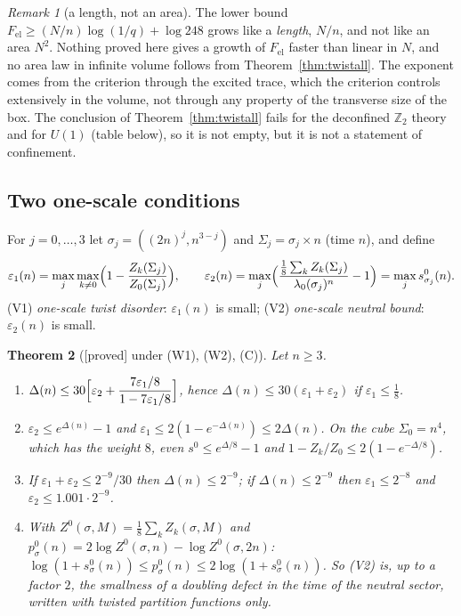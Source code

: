 \documentclass[11pt,a4paper]{article}
\theoremstyle{plain}
\newtheorem{theorem}{Theorem}[section]
\theoremstyle{definition}
\theoremstyle{remark}
\newtheorem{remark}[theorem]{Remark}
\numberwithin{equation}{section}
\newcommand{\Z}{\mathbb{Z}}
\newcommand{\st}[1]{\textsf{[#1]}}
\begin{document}
\begin{remark}[a length, not an area]\label{rem:length}
The lower bound $F_{\mathrm{el}}\ge(N/n)\log(1/q)+\log248$ grows like a \emph{length}, $N/n$, and not like an area $N^2$. Nothing proved here gives a growth of $F_{\mathrm{el}}$ faster than linear in $N$, and no area law in infinite volume follows from Theorem~\ref{thm:twistall}. The exponent comes from the criterion through the excited trace, which the criterion controls extensively in the volume, not through any property of the transverse size of the box. The conclusion of Theorem~\ref{thm:twistall} fails for the deconfined $\Z_2$ theory and for $U(1)$ (table below), so it is not empty, but it is not a statement of confinement.
\end{remark}

\subsection{Two one-scale conditions}\label{subsec:T3}
For $j=0,\dots,3$ let $\sigma_j=((2n)^j,n^{3-j})$ and $\Sigma_j=\sigma_j\times n$ (time $n$), and define
\[
\varepsilon_1(n)=\max_j\max_{k\ne0}\Bigl(1-\frac{Z_k(\Sigma_j)}{Z_0(\Sigma_j)}\Bigr),\qquad
\varepsilon_2(n)=\max_j\Bigl(\frac{\frac18\sum_kZ_k(\Sigma_j)}{\lambda_0(\sigma_j)^n}-1\Bigr)=\max_js^0_{\sigma_j}(n).
\]
(V1) \emph{one-scale twist disorder}: $\varepsilon_1(n)$ is small; (V2) \emph{one-scale neutral bound}: $\varepsilon_2(n)$ is small.
\begin{theorem}[\st{proved} under (W1), (W2), (C)]\label{thm:twosub}
Let $n\ge3$.
\begin{enumerate}
\item[(a)] $\Delta(n)\le30\Bigl[\varepsilon_2+\dfrac{7\varepsilon_1/8}{1-7\varepsilon_1/8}\Bigr]$, hence $\Delta(n)\le30(\varepsilon_1+\varepsilon_2)$ if $\varepsilon_1\le\frac18$.
\item[(b)] $\varepsilon_2\le e^{\Delta(n)}-1$ and $\varepsilon_1\le2(1-e^{-\Delta(n)})\le2\Delta(n)$. On the cube $\Sigma_0=n^4$, which has the weight $8$, even $s^0\le e^{\Delta/8}-1$ and $1-Z_k/Z_0\le2(1-e^{-\Delta/8})$.
\item[(c)] If $\varepsilon_1+\varepsilon_2\le2^{-9}/30$ then $\Delta(n)\le2^{-9}$; if $\Delta(n)\le2^{-9}$ then $\varepsilon_1\le2^{-8}$ and $\varepsilon_2\le1.001\cdot2^{-9}$.
\item[(d)] With $Z^0(\sigma,M)=\frac18\sum_kZ_k(\sigma,M)$ and $p^0_\sigma(n)=2\log Z^0(\sigma,n)-\log Z^0(\sigma,2n)$: $\log(1+s^0_\sigma(n))\le p^0_\sigma(n)\le2\log(1+s^0_\sigma(n))$. So (V2) is, up to a factor $2$, the smallness of a doubling defect \emph{in the time} of the neutral sector, written with twisted partition functions only.
\end{enumerate}
\end{theorem}
\end{document}

